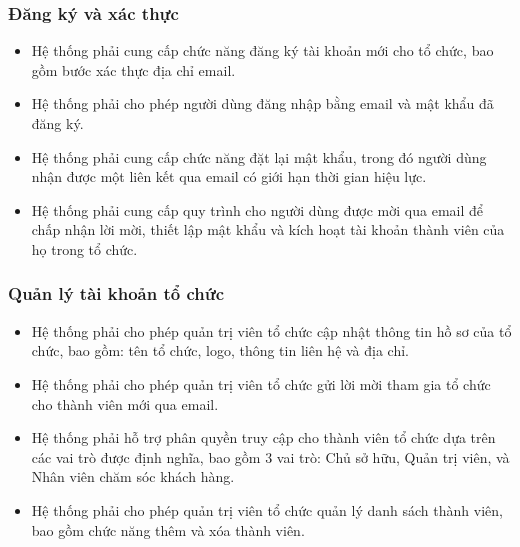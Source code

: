 \subsubsection{Đăng ký và xác thực}
\begin{itemize}
    \item Hệ thống phải cung cấp chức năng đăng ký tài khoản mới cho tổ chức, bao gồm bước xác thực địa chỉ email.
    \item Hệ thống phải cho phép người dùng đăng nhập bằng email và mật khẩu đã đăng ký.
    \item Hệ thống phải cung cấp chức năng đặt lại mật khẩu, trong đó người dùng nhận được một liên kết qua email có giới hạn thời gian hiệu lực.
    \item Hệ thống phải cung cấp quy trình cho người dùng được mời qua email để chấp nhận lời mời, thiết lập mật khẩu và kích hoạt tài khoản thành viên của họ trong tổ chức.
\end{itemize}

\subsubsection{Quản lý tài khoản tổ chức}
\begin{itemize}
    \item Hệ thống phải cho phép quản trị viên tổ chức cập nhật thông tin hồ sơ của tổ chức, bao gồm: tên tổ chức, logo, thông tin liên hệ và địa chỉ.
    \item Hệ thống phải cho phép quản trị viên tổ chức gửi lời mời tham gia tổ chức cho thành viên mới qua email.
    \item Hệ thống phải hỗ trợ phân quyền truy cập cho thành viên tổ chức dựa trên các vai trò được định nghĩa, bao gồm 3 vai trò: Chủ sở hữu, Quản trị viên, và Nhân viên chăm sóc khách hàng.
    \item Hệ thống phải cho phép quản trị viên tổ chức quản lý danh sách thành viên, bao gồm chức năng thêm và xóa thành viên.
\end{itemize}

